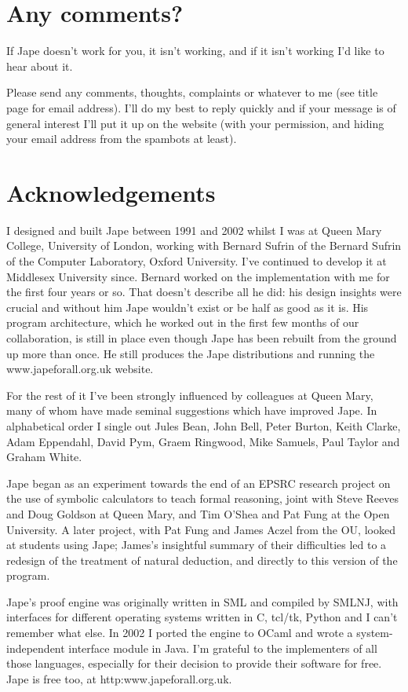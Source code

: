 \documentclass[11pt]{book}
\begin{document}
\section*{Any comments?}

If Jape doesn't work for you, it isn't working, and if it isn't working I'd like to hear about it. 

Please send any comments, thoughts, complaints or whatever to me (see title page for email address). I'll do my best to reply quickly and if your message is of general interest I'll put it up on the website (with your permission, and hiding your email address from the spambots at least). 

\section*{Acknowledgements}

I designed and built Jape between 1991 and 2002 whilst I was at Queen Mary College, University of London, working with Bernard Sufrin of the Bernard Sufrin of the Computer Laboratory, Oxford University. I've continued to develop it at Middlesex University since. Bernard worked on the implementation with me for the first four years or so. That doesn't describe all he did: his design insights were crucial and without him Jape wouldn't exist or be half as good as it is. His program architecture, which he worked out in the first few months of our collaboration, is still in place even though Jape has been rebuilt from the ground up more than once. He still produces the Jape distributions and running the www.japeforall.org.uk website.

For the rest of it I've been strongly influenced by colleagues at Queen Mary, many of whom have made seminal suggestions which have improved Jape. In alphabetical order I single out Jules Bean, John Bell, Peter Burton, Keith Clarke, Adam Eppendahl, David Pym, Graem Ringwood, Mike Samuels, Paul Taylor and Graham White. 

Jape began as an experiment towards the end of an EPSRC research project on the use of symbolic calculators to teach formal reasoning, joint with Steve Reeves and Doug Goldson at Queen Mary, and Tim O'Shea and Pat Fung at the Open University. A later project, with Pat Fung and James Aczel from the OU, looked at students using Jape; James's insightful summary of their difficulties led to a redesign of the treatment of natural deduction, and directly to this version of the program.

Jape's proof engine was originally written in SML and compiled by SMLNJ, with interfaces for different operating systems written in C, tcl/tk, Python and I can't remember what else. In 2002 I ported the engine to OCaml and wrote a system-independent interface module in Java. I'm grateful to the implementers of all those languages, especially for their decision to provide their software for free. Jape is free too, at http:www.japeforall.org.uk. 
\end{document}
